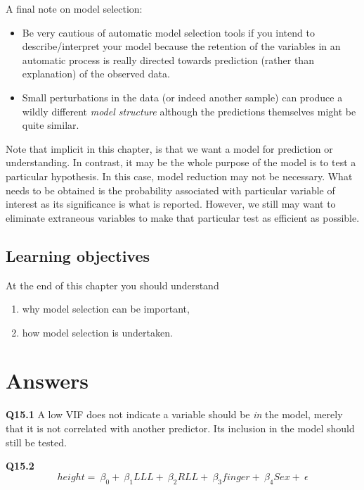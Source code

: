 \documentclass[
  oneside]{krantz}
\providecommand{\tightlist}{%
  \setlength{\itemsep}{0pt}\setlength{\parskip}{0pt}}
\begin{document}
A final note on model selection:

\begin{itemize}
\tightlist
\item
  Be very cautious of automatic model selection tools if you intend to describe/interpret your model because the retention of the variables in an automatic process is really directed towards prediction (rather than explanation) of the observed data.
\item
  Small perturbations in the data (or indeed another sample) can produce a wildly different \emph{model structure} although the predictions themselves might be quite similar.
\end{itemize}

Note that implicit in this chapter, is that we want a model for prediction or understanding. In contrast, it may be the whole purpose of the model is to test a particular hypothesis. In this case, model reduction may not be necessary. What needs to be obtained is the probability associated with particular variable of interest as its significance is what is reported. However, we still may want to eliminate extraneous variables to make that particular test as efficient as possible.

\hypertarget{learning-objectives-3}{%
\subsection{Learning objectives}\label{learning-objectives-3}}

At the end of this chapter you should understand

\begin{enumerate}
\def\labelenumi{\arabic{enumi}.}
\tightlist
\item
  why model selection can be important,\\
\item
  how model selection is undertaken.
\end{enumerate}

\hypertarget{ANSmodsel}{%
\section{Answers}\label{ANSmodsel}}

\textbf{Q15.1} A low VIF does not indicate a variable should be \emph{in} the model, merely that it is not correlated with another predictor. Its inclusion in the model should still be tested.

\textbf{Q15.2} \[
height=\ {\beta{}}_0+\ {\beta{}}_1LLL+\ {\beta{}}_2RLL+\ {\beta{}}_3finger+\
{\beta{}}_4Sex+\ \epsilon{}
\]
\end{document}
